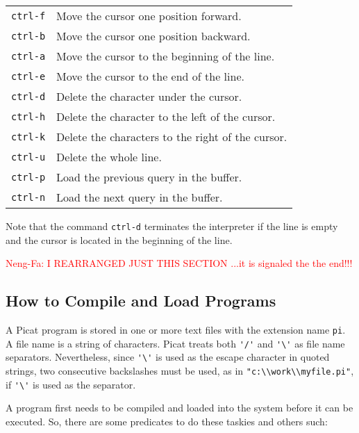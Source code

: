 \begin{tabular}{ll}
\verb+ctrl-f+ & Move the cursor one position forward. \\
\verb+ctrl-b+ & Move the cursor one position backward. \\
\verb+ctrl-a+ & Move the cursor to the beginning of the line. \\
\verb+ctrl-e+ & Move the cursor to the end of the line.  \\
\verb+ctrl-d+ & Delete the character under the cursor.  \\
\verb+ctrl-h+ & Delete the character to the left of the cursor.  \\
\verb+ctrl-k+ & Delete the characters to the right of the cursor. \\
\verb+ctrl-u+ & Delete the whole line.  \\
\verb+ctrl-p+ & Load the previous query in the buffer.  \\
\verb+ctrl-n+ & Load the next query in the buffer.
\end{tabular}

\noindent
Note that the command \verb+ctrl-d+ terminates the interpreter if the line is empty and the cursor is located in the beginning of the line.


\newpage 


{\centering {\bf \textcolor{red}{{\rule{\paperwidth}{5pt}} }}
{\Huge \textcolor{red}{Neng-Fa: I REARRANGED  JUST THIS SECTION ...it is signaled the the end!!!}}}

{\centering {\bf \textcolor{red}{{\rule{\paperwidth}{5pt}} }}}

\subsection{How to Compile and Load Programs}
A Picat program is stored in one or more text files with the extension name \texttt{pi}. A file name is a string of characters. Picat treats both  \verb+'/'+ and \verb+'\'+ as file name separators. Nevertheless, since \verb+'\'+ is used as the escape character in quoted strings, two consecutive backslashes must be used, as in \verb+"c:\\work\\myfile.pi"+, if \verb+'\'+ is used as the separator.

A program first needs to be compiled and loaded into the system before it can be executed. So, there are some
predicates to do these taskies and others such:


